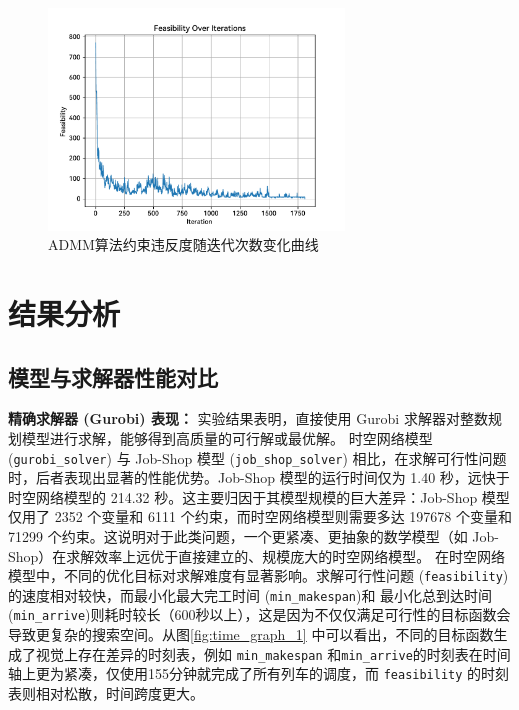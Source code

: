 \documentclass{article}
\begin{document}
    \begin{figure}
        \centering
        \includegraphics[width = 0.7\textwidth]{fig/admm_feas}
        \caption{ADMM算法约束违反度随迭代次数变化曲线}
        \label{fig:admm_infeasibility}
    \end{figure}


    \section{结果分析}

    \subsection{模型与求解器性能对比}

    \textbf{精确求解器 (Gurobi) 表现：}
    实验结果表明，直接使用 Gurobi 求解器对整数规划模型进行求解，能够得到高质量的可行解或最优解。 时空网络模型 (\texttt{gurobi\_solver}) 与 Job-Shop 模型 (\texttt{job\_shop\_solver}) 相比，在求解可行性问题时，后者表现出显著的性能优势。Job-Shop 模型的运行时间仅为 1.40 秒，远快于时空网络模型的 214.32 秒。这主要归因于其模型规模的巨大差异：Job-Shop 模型仅用了 2352 个变量和 6111 个约束，而时空网络模型则需要多达 197678 个变量和 71299 个约束。这说明对于此类问题，一个更紧凑、更抽象的数学模型（如 Job-Shop）在求解效率上远优于直接建立的、规模庞大的时空网络模型。
    在时空网络模型中，不同的优化目标对求解难度有显著影响。求解可行性问题 (\texttt{feasibility})的速度相对较快，而最小化最大完工时间 (\texttt{min\_makespan})和 最小化总到达时间 (\texttt{min\_arrive})则耗时较长（600秒以上），这是因为不仅仅满足可行性的目标函数会导致更复杂的搜索空间。从图\ref{fig:time_graph_1} 中可以看出，不同的目标函数生成了视觉上存在差异的时刻表，例如 \texttt{min\_makespan} 和\texttt{min\_arrive}的时刻表在时间轴上更为紧凑，仅使用155分钟就完成了所有列车的调度，而 \texttt{feasibility} 的时刻表则相对松散，时间跨度更大。
\end{document}
